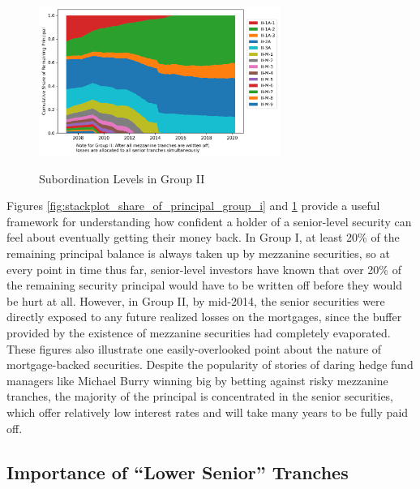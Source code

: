 \documentclass[12pt]{article}
\begin{document}
\begin{figure}[h]
	\centering
	\caption{Subordination Levels in Group II}
	\includegraphics[width=0.7\textwidth]{../figures/stackplot_share_of_principal_group_ii}
	\label{fig:stackplot_share_of_principal_group_ii}
\end{figure}

Figures \ref{fig:stackplot_share_of_principal_group_i} and \ref{fig:stackplot_share_of_principal_group_ii} provide a useful framework for understanding how confident a holder of a senior-level security can feel about eventually getting their money back. In Group I, at least 20\% of the remaining principal balance is always taken up by mezzanine securities, so at every point in time thus far, senior-level investors have known that over 20\% of the remaining security principal would have to be written off before they would be hurt at all. However, in Group II, by mid-2014, the senior securities were directly exposed to any future realized losses on the mortgages, since the buffer provided by the existence of mezzanine securities had completely evaporated. These figures also illustrate one easily-overlooked point about the nature of mortgage-backed securities. Despite the popularity of stories of daring hedge fund managers like Michael Burry winning big by betting against risky mezzanine tranches, the majority of the principal is concentrated in the senior securities, which offer relatively low interest rates and will take many years to be fully paid off.


\subsection*{Importance of ``Lower Senior'' Tranches}
\end{document}
